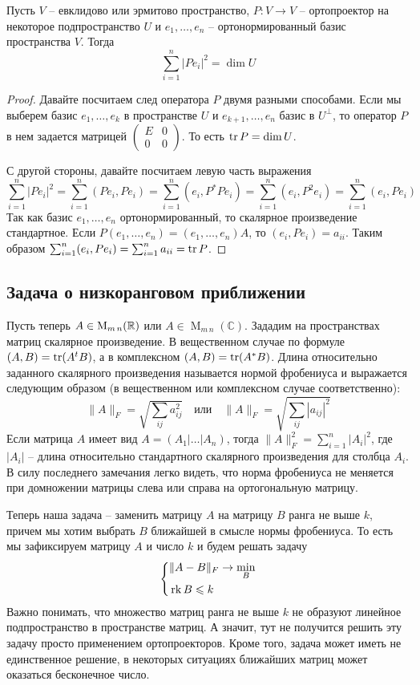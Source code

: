 \begin{claim}
\label{claim::BasisProj}
Пусть $V$ -- евклидово или эрмитово пространство, $P\colon V\to V$ -- ортопроектор на некоторое подпространство $U$ и $e_1,\ldots,e_n$ -- ортонормированный базис пространства $V$.
Тогда
\[
\sum_{i=1}^n |Pe_i|^2 = \dim U
\]
\end{claim}
\begin{proof}
Давайте посчитаем след оператора $P$ двумя разными способами.
Если мы выберем базис $e_1,\ldots,e_k$ в пространстве $U$ и $e_{k+1}, \ldots,e_n$ базис в $U^\bot$, то оператор $P$ в нем задается матрицей $\left(\begin{smallmatrix}{E}&{0}\\{0}&{0}\end{smallmatrix}\right)$.
То есть $\operatorname{tr} P = \dim U$.

С другой стороны, давайте посчитаем левую часть выражения
\[
\sum_{i=1}^n |Pe_i|^2 = \sum_{i=1}^n (Pe_i, Pe_i) = \sum_{i=1}^n (e_i, P^*Pe_i) = \sum_{i=1}^n (e_i, P^2e_i) = \sum_{i=1}^n (e_i, Pe_i)
\]
Так как базис $e_1,\ldots,e_n$ ортонормированный, то скалярное произведение стандартное.
Если $P(e_1,\ldots,e_n) = (e_1,\ldots,e_n)A$, то $(e_i, Pe_i) = a_{ii}$.
Таким образом $ \sum_{i=1}^n (e_i, Pe_i) = \sum_{i=1}^na_{ii} = \operatorname{tr} P$.
\end{proof}

\subsection{Задача о низкоранговом приближении}
\label{section::Approx}

Пусть теперь $A\in \operatorname{M}_{m\,n}(\mathbb R)$ или $A\in \operatorname{M}_{m\,n}(\mathbb C)$.
Зададим на пространствах матриц скалярное произведение.
В вещественном случае по формуле $(A, B) = \operatorname{tr}(A^t B)$, а в комплексном $(A, B) = \operatorname{tr}(A^*B)$.
Длина относительно заданного скалярного произведения называется нормой фробениуса и выражается следующим образом (в вещественном или комплексном случае соответственно):
\[
\|A\|_F = \sqrt{\sum_{ij}a_{ij}^2}
\quad\text{или}\quad
\|A\|_F = \sqrt{\sum_{ij}|a_{ij}|^2}
\]
Если матрица $A$ имеет вид $A = (A_1|\ldots|A_n)$, тогда $\|A\|_F^2 = \sum_{i=1}^n |A_i|^2$, где $|A_i|$ -- длина относительно стандартного скалярного произведения для столбца $A_i$.
В силу последнего замечания легко видеть, что норма фробениуса не меняется при домножении матрицы слева или справа на ортогональную матрицу.

Теперь наша задача -- заменить матрицу $A$ на матрицу $B$ ранга не выше $k$, причем мы хотим выбрать $B$ ближайшей в смысле нормы фробениуса.
То есть мы зафиксируем матрицу $A$ и число $k$ и будем решать задачу
\[
\left\{
\begin{aligned}
&\|A - B\|_F \to \min_B\\
&\operatorname{rk} B \leqslant k
\end{aligned}
\right.
\]
Важно понимать, что множество матриц ранга не выше $k$ не образуют линейное подпространство в пространстве матриц.
А значит, тут не получится решить эту задачу просто применением ортопроекторов.
Кроме того, задача может иметь не единственное решение, в некоторых ситуациях ближайших матриц может оказаться бесконечное число.

